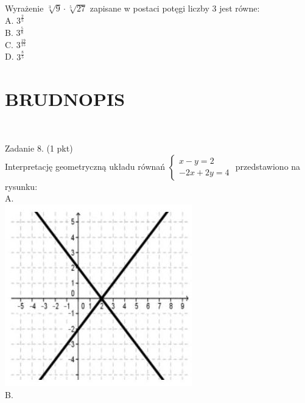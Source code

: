 \documentclass[10pt]{article}
\begin{document}
Wyrażenie \(\sqrt[3]{9} \cdot \sqrt[5]{27}\) zapisane w postaci potęgi liczby 3 jest równe:\\
A. \(3^{\frac{2}{5}}\)\\
B. \(3^{\frac{5}{8}}\)\\
C. \(3^{\frac{19}{15}}\)\\
D. \(3^{\frac{8}{5}}\)

\section*{BRUDNOPIS}
\(\qquad\)

Zadanie 8. (1 pkt)\\
Interpretację geometryczną układu równań \(\left\{\begin{array}{c}x-y=2 \\ -2 x+2 y=4\end{array}\right.\) przedstawiono na rysunku:\\
A.\\
\includegraphics[max width=\textwidth, center]{2024_11_21_9a9f600c3b3af5013d80g-04(3)}\\
B.\\
\end{document}
